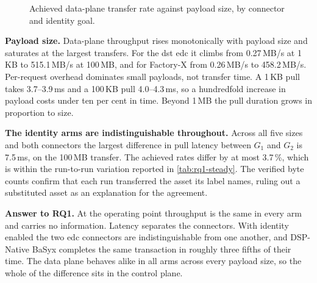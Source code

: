 \begin{figure}[ht]
    \centering
    \caption[Data-plane rate against payload size]{Achieved data-plane transfer rate against payload size, by connector and identity goal.}
    \label{fig:rq1-payload}
\end{figure}

\textbf{Payload size.} Data-plane throughput rises monotonically with payload size and saturates at the largest transfers. For the \gls{dst} \gls{edc} it climbs from 0.27\,MB/s at 1\,KB to 515.1\,MB/s at 100\,MB, and for Factory-X from 0.26\,MB/s to 458.2\,MB/s. Per-request overhead dominates small payloads, not transfer time. A 1\,KB pull takes 3.7--3.9\,ms and a 100\,KB pull 4.0--4.3\,ms, so a hundredfold increase in payload costs under ten per cent in time. Beyond 1\,MB the pull duration grows in proportion to size.

\pagebreak

\textbf{The identity arms are indistinguishable throughout.} Across all five sizes and both connectors the largest difference in pull latency between $G_1$ and $G_2$ is 7.5\,ms, on the 100\,MB transfer. The achieved rates differ by at most 3.7\,\%, which is within the run-to-run variation reported in \cref{tab:rq1-steady}. The verified byte counts confirm that each run transferred the asset its label names, ruling out a substituted asset as an explanation for the agreement.

\textbf{Answer to RQ1.} At the operating point throughput is the same in every arm and carries no information. Latency separates the connectors. With identity enabled the two \gls{edc} connectors are indistinguishable from one another, and DSP-Native BaSyx completes the same transaction in roughly three fifths of their time. The data plane behaves alike in all arms across every payload size, so the whole of the difference sits in the control plane.


